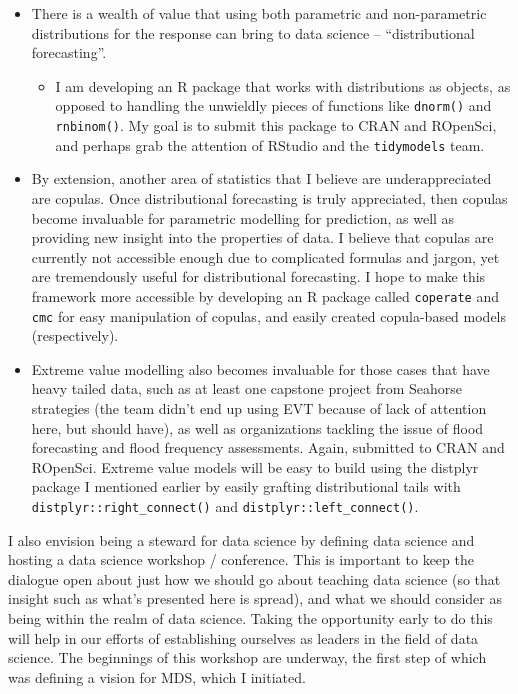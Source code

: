 \documentclass[]{article}
\providecommand{\tightlist}{%
  \setlength{\itemsep}{0pt}\setlength{\parskip}{0pt}}
\begin{document}
\begin{itemize}
\tightlist
\item
  There is a wealth of value that using both parametric and non-parametric distributions for the response can bring to data science -- ``distributional forecasting''.

  \begin{itemize}
  \tightlist
  \item
    I am developing an R package that works with distributions as objects, as opposed to handling the unwieldly pieces of functions like \texttt{dnorm()} and \texttt{rnbinom()}. My goal is to submit this package to CRAN and ROpenSci, and perhaps grab the attention of RStudio and the \texttt{tidymodels} team.
  \end{itemize}
\item
  By extension, another area of statistics that I believe are underappreciated are copulas. Once distributional forecasting is truly appreciated, then copulas become invaluable for parametric modelling for prediction, as well as providing new insight into the properties of data. I believe that copulas are currently not accessible enough due to complicated formulas and jargon, yet are tremendously useful for distributional forecasting. I hope to make this framework more accessible by developing an R package called \texttt{coperate} and \texttt{cmc} for easy manipulation of copulas, and easily created copula-based models (respectively).
\item
  Extreme value modelling also becomes invaluable for those cases that have heavy tailed data, such as at least one capstone project from Seahorse strategies (the team didn't end up using EVT because of lack of attention here, but should have), as well as organizations tackling the issue of flood forecasting and flood frequency assessments. Again, submitted to CRAN and ROpenSci. Extreme value models will be easy to build using the distplyr package I mentioned earlier by easily grafting distributional tails with \texttt{distplyr::right\_connect()} and \texttt{distplyr::left\_connect()}.
\end{itemize}

I also envision being a steward for data science by defining data science and hosting a data science workshop / conference. This is important to keep the dialogue open about just how we should go about teaching data science (so that insight such as what's presented here is spread), and what we should consider as being within the realm of data science. Taking the opportunity early to do this will help in our efforts of establishing ourselves as leaders in the field of data science. The beginnings of this workshop are underway, the first step of which was defining a vision for MDS, which I initiated.
\end{document}
